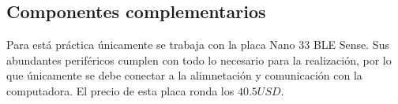 \subsection{Componentes complementarios}
Para está práctica únicamente se trabaja con la placa Nano 33 BLE Sense. Sus abundantes periféricos cumplen con todo lo necesario para la realización, por lo que únicamente se debe conectar a la alimnetación y comunicación con la computadora. El precio de esta placa ronda los $40.5 USD$.